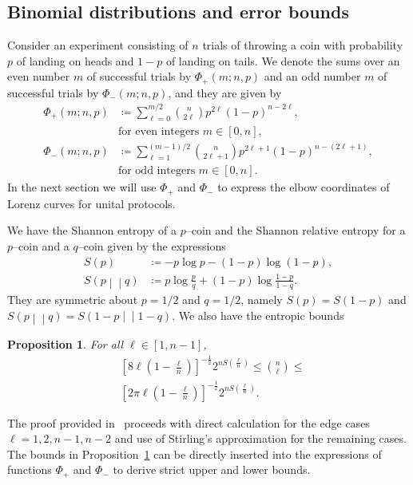 \documentclass[
twocolumn,
superscriptaddress
]{revtex4-1}
\newtheorem{proposition}[theorem]{Proposition}
\newcommand{\ent}[2]{S\left( #1 \middle\vert\middle\vert #2 \right)}
\begin{document}
\subsection*{Binomial distributions and error bounds}
Consider an experiment consisting of $n$ trials of throwing a coin with probability $p$ of landing on heads and $1-p$ of landing on tails.
We denote the sums over an even number $m$ of successful trials by $\Phi_+(m; n, p)$ and an odd number $m$ of successful trials by $\Phi_-(m; n, p)$, and they are given by
\begin{align}	
	\Phi_+(m; n, p) &\coloneqq \sum\limits_{\ell=0}^{m/2} \binom{n}{2\ell} p^{2\ell} (1-p)^{n-2\ell}, \nonumber\\ 
	&\text{for even integers } m\in[0,n], \label{eq:fp_app} \\
	\Phi_-(m; n, p) &\coloneqq \sum\limits_{\ell=1}^{(m-1)/2} \binom{n}{2\ell+1} p^{2\ell+1} (1-p)^{n-(2\ell+1)}, \nonumber\\ 
	&\text{for odd integers }m\in[0,n]. \label{eq:fn_app}
\end{align}
In the next section we will use $\Phi_+$ and $\Phi_-$ to express the elbow coordinates of Lorenz curves for unital protocols.

We have the Shannon entropy of a $p$--coin and the Shannon relative entropy for a $p$--coin and a $q$--coin given by the expressions
\begin{align}
	S(p) &\coloneqq -p\log{p} -(1-p)\log{(1-p)}, \label{eq:ent}\\
	\ent{p}{q} &\coloneqq p \log{\frac{p}{q}} + (1-p) \log{\frac{1-p}{1-q}}. \label{eq:ent_rel}
\end{align}
They are symmetric about $p=1/2$ and $q=1/2$, namely $S(p) = S(1-p)$ and $\ent{p}{q} = \ent{1-p}{1-q}$. We also have the entropic bounds
\begin{proposition}\label{comb_bounds}
	For all $\ell\in [1,n-1]$,
	\begin{align}
		&\left[ 8\ell\left(1-\frac{\ell}{n}\right) \right]^{-\frac{1}{2}} 2^{n S\left(\frac{\ell}{n}\right)} \leq \binom{n}{\ell} \leq \\
		&\left[ 2\pi \ell\left(1-\frac{\ell}{n}\right) \right]^{-\frac{1}{2}} 2^{n S\left(\frac{\ell}{n}\right)}.
	\end{align}
\end{proposition}
The proof provided in~\cite{cit:ash} proceeds with direct calculation for the edge cases $\ell = 1,2, n-1, n-2$ and use of Stirling's approximation for the remaining cases. The bounds in Proposition~\ref{comb_bounds} can be directly inserted into the expressions of functions $\Phi_+$ and $\Phi_-$ to derive strict upper and lower bounds.
\end{document}
